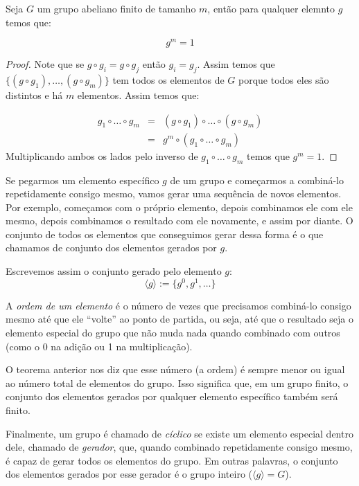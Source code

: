 \begin{theorem}[Euller]
\label{theo:gen-euler}
Seja $G$ um grupo abeliano finito de tamanho $m$, então para qualquer elemnto $g$ temos que:

\begin{displaymath}
  g^m = 1
\end{displaymath}
\end{theorem}
\begin{proof}
  Note que se $g \circ g_i = g \circ g_j$ então $g_i = g_j$.
  Assim temos que $\{(g \circ g_1), \dots, (g \circ g_m)\}$ tem todos os elementos de $G$ porque todos eles são distintos e há $m$ elementos.
  Assim temos que:

  \begin{eqnarray*}
    g_1 \circ \dots \circ g_m & = & (g \circ g_1) \circ \dots \circ (g \circ g_m)\\
                              & = & g^m \circ (g_1 \circ \dots \circ g_m)
  \end{eqnarray*}
  Multiplicando ambos os lados pelo inverso de $g_1 \circ \dots \circ g_m$ temos que $g^m = 1$.
\end{proof}

Se pegarmos um elemento específico $g$ de um grupo e começarmos a combiná-lo repetidamente consigo mesmo, vamos gerar uma sequência de novos elementos.
Por exemplo, começamos com o próprio elemento, depois combinamos ele com ele mesmo, depois combinamos o resultado com ele novamente, e assim por diante.
O conjunto de todos os elementos que conseguimos gerar dessa forma é o que chamamos de conjunto dos elementos gerados por $g$.

Escrevemos assim o conjunto gerado pelo elemento $g$:
\begin{displaymath}
  \langle g \rangle := \{g^0, g^1, \dots \}
\end{displaymath}

A {\em ordem de um elemento} é o número de vezes que precisamos combiná-lo consigo mesmo até que ele ``volte'' ao ponto de partida, ou seja, até que o resultado seja o elemento especial do grupo que não muda nada quando combinado com outros (como o 0 na adição ou 1 na multiplicação).

O teorema anterior nos diz que esse número (a ordem) é sempre menor ou igual ao número total de elementos do grupo.
Isso significa que, em um grupo finito, o conjunto dos elementos gerados por qualquer elemento específico também será finito.

Finalmente, um grupo é chamado de {\em cíclico} se existe um elemento especial dentro dele, chamado de {\em gerador}, que, quando combinado repetidamente consigo mesmo, é capaz de gerar todos os elementos do grupo.
Em outras palavras, o conjunto dos elementos gerados por esse gerador é o grupo inteiro ($\langle g \rangle = G$).

